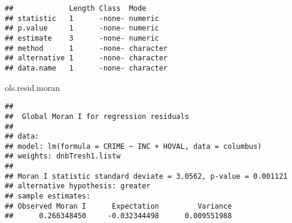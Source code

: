 \documentclass[
]{book}
\newenvironment{Shaded}{\begin{snugshade}}{\end{snugshade}}
\newcommand{\NormalTok}[1]{#1}
\begin{document}
\begin{verbatim}
##             Length Class  Mode     
## statistic   1      -none- numeric  
## p.value     1      -none- numeric  
## estimate    3      -none- numeric  
## method      1      -none- character
## alternative 1      -none- character
## data.name   1      -none- character
\end{verbatim}

\begin{Shaded}
\begin{Highlighting}[]
\NormalTok{ols.resid.moran}
\end{Highlighting}
\end{Shaded}

\begin{verbatim}
## 
##  Global Moran I for regression residuals
## 
## data:  
## model: lm(formula = CRIME ~ INC + HOVAL, data = columbus)
## weights: dnbTresh1.listw
## 
## Moran I statistic standard deviate = 3.0562, p-value = 0.001121
## alternative hypothesis: greater
## sample estimates:
## Observed Moran I      Expectation         Variance 
##      0.266348450     -0.032344498      0.009551988
\end{verbatim}

  
\end{document}

